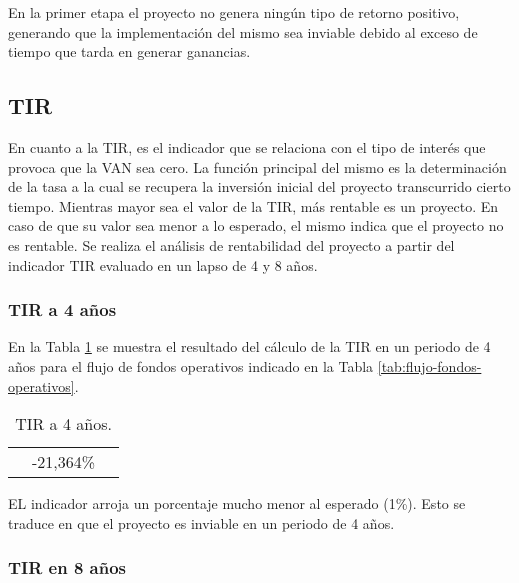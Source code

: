 En la primer etapa el proyecto no genera ningún tipo de retorno positivo, generando que la implementación del mismo sea inviable debido al exceso de tiempo que tarda en generar ganancias.

\subsection{TIR}

En cuanto a la TIR, es el indicador que se relaciona con el tipo de interés que provoca que la VAN sea cero. La función principal del mismo es la determinación de la tasa a la cual se recupera la inversión inicial del proyecto transcurrido cierto tiempo. Mientras mayor sea el valor de la TIR, más rentable es un proyecto. En caso de que su valor sea menor a lo esperado, el mismo indica que el proyecto no es rentable. Se realiza el análisis de rentabilidad del proyecto a partir del indicador TIR evaluado en un lapso de 4 y 8 años.

\subsubsection{TIR a 4 años}

En la Tabla \ref{tab:tir-4} se muestra el resultado del cálculo de la TIR en un periodo de 4 años para el flujo de fondos operativos indicado en la Tabla \ref{tab:flujo-fondos-operativos}.

\begin{table}[H]
  \centering
    \begin{tabular}{|cc|r|}
    \rowcolor[rgb]{ .773,  .851,  .945} \multicolumn{3}{c}{\textbf{a 4 años}} \bigstrut[b]\\
    \hline
    \rowcolor[rgb]{ .773,  .851,  .945} \multicolumn{2}{|c|}{\textbf{TIR}} & \cellcolor[rgb]{ 1,  1,  1}-21,364\% \bigstrut\\
    \hline
    \end{tabular}%
  \caption{TIR a 4 años.}    
  \label{tab:tir-4}%
\end{table}%


EL indicador arroja un porcentaje mucho menor al esperado (1\%). Esto se traduce en que el proyecto es inviable en un periodo de 4 años.

\subsubsection{TIR en 8 años}

